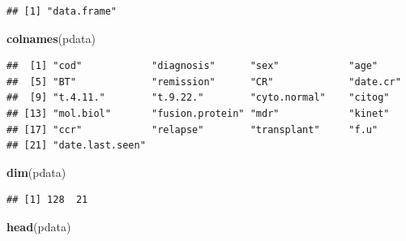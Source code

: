\documentclass[]{article}
\newenvironment{Shaded}{\begin{snugshade}}{\end{snugshade}}
\newcommand{\KeywordTok}[1]{\textcolor[rgb]{0.13,0.29,0.53}{\textbf{#1}}}
\newcommand{\NormalTok}[1]{#1}
\theoremstyle{definition}
\theoremstyle{definition}
\theoremstyle{remark}
\begin{document}
\begin{verbatim}
## [1] "data.frame"
\end{verbatim}

\begin{Shaded}
\begin{Highlighting}[]
\KeywordTok{colnames}\NormalTok{(pdata)}
\end{Highlighting}
\end{Shaded}

\begin{verbatim}
##  [1] "cod"            "diagnosis"      "sex"            "age"           
##  [5] "BT"             "remission"      "CR"             "date.cr"       
##  [9] "t.4.11."        "t.9.22."        "cyto.normal"    "citog"         
## [13] "mol.biol"       "fusion.protein" "mdr"            "kinet"         
## [17] "ccr"            "relapse"        "transplant"     "f.u"           
## [21] "date.last.seen"
\end{verbatim}

\begin{Shaded}
\begin{Highlighting}[]
\KeywordTok{dim}\NormalTok{(pdata)}
\end{Highlighting}
\end{Shaded}

\begin{verbatim}
## [1] 128  21
\end{verbatim}

\begin{Shaded}
\begin{Highlighting}[]
\KeywordTok{head}\NormalTok{(pdata)}
\end{Highlighting}
\end{Shaded}
\end{document}
